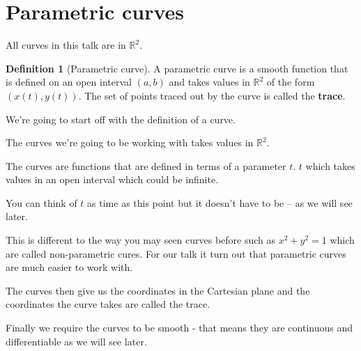 \documentclass[]{article} %
\theoremstyle{definition}
\newtheorem{definition}{Definition}[section]
\theoremstyle{theorem}
\begin{document}
\section{Parametric curves}
\begin{tcolorbox}
	All curves in this talk are in $\mathbb{R}^2$.
	\begin{definition}[Parametric curve]
		A parametric curve is a smooth function that is defined on an open interval $(a, b)$ and takes values in $\mathbb{R}^2$ of the form $(x(t), y(t))$.
		\newline
		The set of points traced out by the curve is called the \textbf{trace}.
	\end{definition}
\end{tcolorbox}

We're going to start off with the definition of a curve. 

The curves we’re going to be working with takes values in $\mathbb{R}^2$.
 
The curves are functions that are defined in terms of a parameter $t$. $t$ which takes values in an open interval which could be infinite.

You can think of $t$ as time as this point but it doesn’t have to be -- as we will see later. 

This is different to the way you may seen curves before such as $x^2 + y^2 = 1$ which are called non-parametric cures. For our talk it turn out that parametric curves are much easier to work with.

The curves then give us the coordinates in the Cartesian plane and the coordinates the curve takes are called the trace.

Finally we require the curves to be smooth - that means they are continuous and differentiable as we will see later. 
\end{document}
